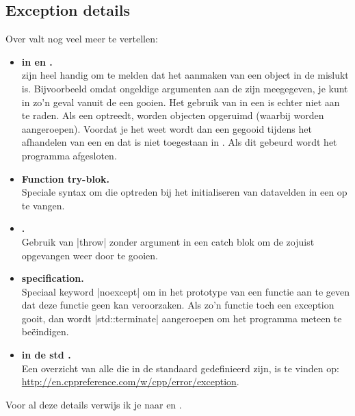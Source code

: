 \begin{cpplstShortInline}
\section{Exception details}
Over  valt nog veel meer te vertellen:
\begin{itemize}
    \item \textbf{ in  en .}\\
     zijn heel handig om te melden dat het aanmaken van een object in de  mislukt is.
    Bijvoorbeeld omdat ongeldige argumenten aan de  zijn meegegeven, je kunt in zo'n geval vanuit de  een  gooien.
    Het gebruik van  in een  is echter niet aan te raden.
    Als een  optreedt, worden objecten opgeruimd (waarbij  worden aangeroepen).
    Voordat je het weet wordt dan een  gegooid tijdens het afhandelen van een  en dat is niet toegestaan in \Cpp{}. Als dit gebeurd wordt het programma afgesloten.
    \item \textbf{Function try\hyp{}blok.}\\
    Speciale syntax om  die optreden bij het initialiseren van datavelden in een  op te vangen.
    \item \textbf{.}\\
    Gebruik van |throw| zonder argument in een catch blok om de zojuist opgevangen  weer door te gooien.
    \item \textbf{ specification.}\\
    Speciaal keyword |noexcept| om in het prototype van een functie aan te geven dat deze functie geen  kan veroorzaken.
	Als zo'n functie toch een exception gooit, dan wordt |std::terminate| aangeroepen om het programma meteen te beëindigen.
    \item \textbf{ in de std .}\\
    Een overzicht van alle  die in de standaard  gedefinieerd zijn, is te vinden op: \url{http://en.cppreference.com/w/cpp/error/exception}.
\end{itemize}
Voor al deze details verwijs ik je naar \cite[\href{http://www.icce.rug.nl/documents/cplusplus/cplusplus10.html}{hoofdstuk 10}]{Brokken2019} en \cite[hoofdstuk 10]{Stroustrup2013}.


\end{cpplstShortInline}
